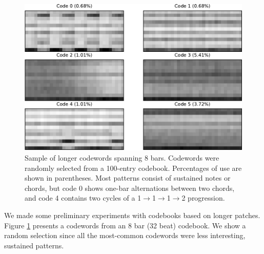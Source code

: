 \documentclass{article}
\begin{document}
\begin{figure}[htb]
\begin{center}
\includegraphics[width=.8\columnwidth]{codes_8bars}
\end{center}
\caption{\small{Sample of longer codewords spanning $8$
    bars. Codewords were randomly selected from a 100-entry 
    codebook. Percentages of use are shown in parentheses.  Most patterns
    consist of sustained notes or chords, but code 0 shows one-bar 
    alternations between two chords, and code 4 contains two cycles of a
    1$\rightarrow$1$\rightarrow$1$\rightarrow$2 progression.}}
\label{fig:codes8bars}
\end{figure}

We made some preliminary experiments with codebooks based on 
longer patches.  Figure \ref{fig:codes8bars} presents a codewords 
from an 8 bar (32 beat) codebook.  We show a random selection 
since all the most-common codewords were less interesting, sustained 
patterns.

\end{document}
